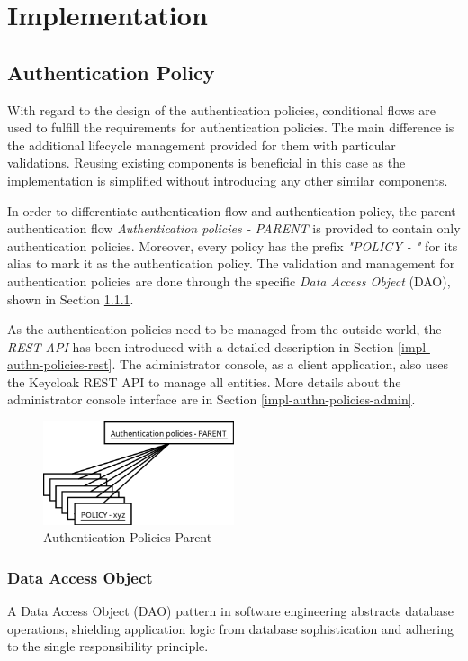 \chapter{Implementation}

\section{Authentication Policy}
With regard to the design of the authentication policies, conditional flows are used to fulfill the requirements for authentication policies.
The main difference is the additional lifecycle management provided for them with particular validations.
Reusing existing components is beneficial in this case as the implementation is simplified without introducing any other similar components.

In order to differentiate authentication flow and authentication policy, the parent authentication flow \textit{Authentication policies - PARENT} is provided to contain only authentication policies.
Moreover, every policy has the prefix \textit{"POLICY - "} for its alias to mark it as the authentication policy.
The validation and management for authentication policies are done through the specific \textit{Data Access Object} (DAO), shown in Section \ref{impl-authn-policies-dao}. 

As the authentication policies need to be managed from the outside world, the \textit{REST API} has been introduced with a detailed description in Section \ref{impl-authn-policies-rest}.
The administrator console, as a client application, also uses the Keycloak REST API to manage all entities.
More details about the administrator console interface are in Section \ref{impl-authn-policies-admin}.

\begin{figure}[htbp]
  \centering
  \includegraphics[width=0.5\textwidth]{img/sections/6-implementation/auth-policies-parent.png}
  \caption{Authentication Policies Parent}
  \label{fig:impl-authn-policies-parent}
\end{figure}

\newpage

\subsection{Data Access Object} \label{impl-authn-policies-dao}
A Data Access Object (DAO) pattern in software engineering abstracts database operations, shielding application logic from database sophistication and adhering to the single responsibility principle.\cite{impl-dao}

